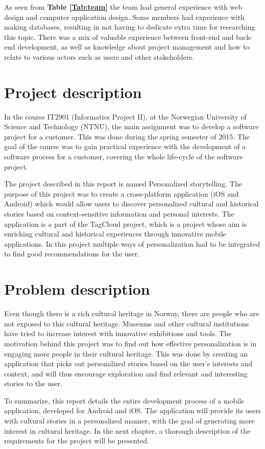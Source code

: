 As seen from \textbf{Table \ref{Tab:team}} the team had general experience with web design and computer application design. Some members had experience with making databases, resulting in not having to dedicate extra time for researching this topic. There was a mix of valuable experience between front-end and back-end development, as well as knowledge about project management and how to relate to various actors such as users and other stakeholders.

\section{Project description}

In the course IT2901 \cite{es20} (Informatics Project II), at the Norwegian University of Science and Technology (NTNU), the main assignment was to develop a software project for a customer. This was done during the spring semester of 2015. The goal of the course was to gain practical experience with the development of a software process for a customer, covering the whole life-cycle of the software project.\newline

The project described in this report is named Personalized storytelling. The purpose of this project was to create a cross-platform application (iOS and Android) which would allow users to discover personalized cultural and historical stories based on context-sensitive information and personal interests. The application is a part of the TagCloud \cite{es21} project, which is a project whose aim is enriching cultural and historical experiences through innovative mobile applications.
In this project multiple ways of personalization had to be integrated to find good recommendations for the user.

\section{Problem description}

Even though there is a rich cultural heritage in Norway, there are people who are not exposed to this cultural heritage. Museums and other cultural institutions have tried to increase interest with innovative exhibitions and tools. The motivation behind this project was to find out how effective personalization is in engaging more people in their cultural heritage. This was done by creating an application that picks out personalized stories based on the user's interests and context, and will thus encourage exploration and find relevant and interesting stories to the user. \newline

To summarize, this report details the entire development process of a mobile application, developed for Android and iOS. The application will provide its users with cultural stories in a personalized manner, with the goal of generating more interest in cultural heritage. In the next chapter, a thorough description of the requirements for the project will be presented.

\cleardoublepage